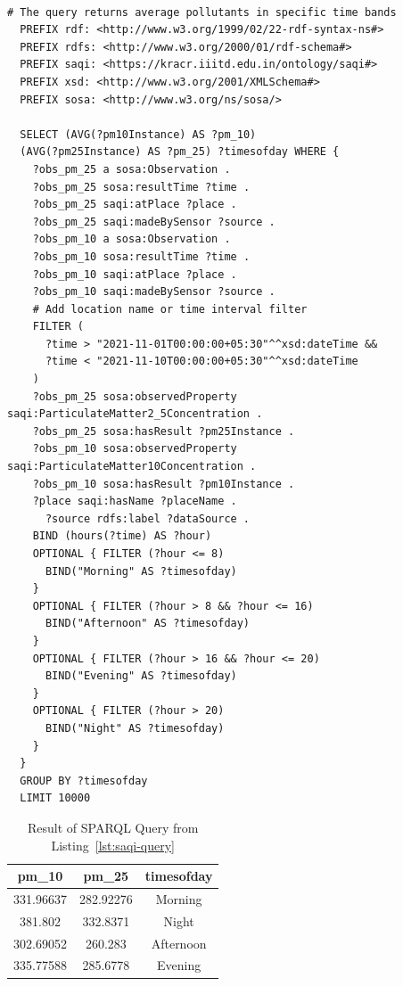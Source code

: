  \begin{lstlisting}[label=lst:saqi-query,caption={An example of a SPARQL query used by saqi; output of this query is present in Table~\protect\ref{saqi-query-result}},float,frame=tb,captionpos=b,basicstyle=\ttfamily\small]
 
# The query returns average pollutants in specific time bands
  PREFIX rdf: <http://www.w3.org/1999/02/22-rdf-syntax-ns#>
  PREFIX rdfs: <http://www.w3.org/2000/01/rdf-schema#>
  PREFIX saqi: <https://kracr.iiitd.edu.in/ontology/saqi#>
  PREFIX xsd: <http://www.w3.org/2001/XMLSchema#>
  PREFIX sosa: <http://www.w3.org/ns/sosa/>
  
  SELECT (AVG(?pm10Instance) AS ?pm_10) 
  (AVG(?pm25Instance) AS ?pm_25) ?timesofday WHERE {
    ?obs_pm_25 a sosa:Observation .
    ?obs_pm_25 sosa:resultTime ?time .
    ?obs_pm_25 saqi:atPlace ?place .
    ?obs_pm_25 saqi:madeBySensor ?source .
    ?obs_pm_10 a sosa:Observation .
    ?obs_pm_10 sosa:resultTime ?time .
    ?obs_pm_10 saqi:atPlace ?place .
    ?obs_pm_10 saqi:madeBySensor ?source .
  	# Add location name or time interval filter
    FILTER (
      ?time > "2021-11-01T00:00:00+05:30"^^xsd:dateTime &&
      ?time < "2021-11-10T00:00:00+05:30"^^xsd:dateTime
    )
    ?obs_pm_25 sosa:observedProperty saqi:ParticulateMatter2_5Concentration .
    ?obs_pm_25 sosa:hasResult ?pm25Instance .
    ?obs_pm_10 sosa:observedProperty saqi:ParticulateMatter10Concentration .
    ?obs_pm_10 sosa:hasResult ?pm10Instance .
  	?place saqi:hasName ?placeName .
	  ?source rdfs:label ?dataSource .
    BIND (hours(?time) AS ?hour)
    OPTIONAL { FILTER (?hour <= 8)
      BIND("Morning" AS ?timesofday)
    }
    OPTIONAL { FILTER (?hour > 8 && ?hour <= 16)
      BIND("Afternoon" AS ?timesofday)
    }
    OPTIONAL { FILTER (?hour > 16 && ?hour <= 20)
      BIND("Evening" AS ?timesofday)
    }
    OPTIONAL { FILTER (?hour > 20)
      BIND("Night" AS ?timesofday)
    }
  } 
  GROUP BY ?timesofday
  LIMIT 10000
\end{lstlisting}

\begin{table}[!h]
\begin{center}
\caption{Result of SPARQL Query from Listing~\ref{lst:saqi-query}}
\label{saqi-query-result}
\begin{tabular}{|c c c|} 
 \hline
 pm\_10 & pm\_25 & timesofday \\ [0.5ex] 
 \hline\hline
 331.96637 & 282.92276 & Morning \\ 
 \hline
 381.802 & 332.8371 & Night \\
 \hline
 302.69052 & 260.283 & Afternoon \\
 \hline
 335.77588 & 285.6778 & Evening \\ [1ex] 
 \hline
\end{tabular}
\end{center}
\end{table}

